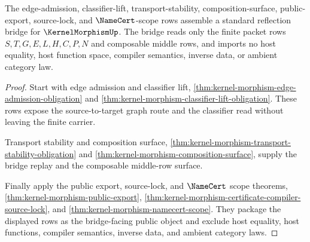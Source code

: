 \begin{theorem}
\label{thm:kernel-morphism-standard-reflection-bridge}
The edge-admission, classifier-lift, transport-stability, composition-surface, public-export, source-lock, and $\NameCert$-scope rows assemble a standard reflection bridge for $\KernelMorphismUp$. The bridge reads only the finite packet rows $S,T,G,E,L,H,C,P,N$ and composable middle rows, and imports no host equality, host function space, compiler semantics, inverse data, or ambient category law.
\end{theorem}
\begin{proof}
Start with edge admission and classifier lift, \autoref{thm:kernel-morphism-edge-admission-obligation} and \autoref{thm:kernel-morphism-classifier-lift-obligation}. These rows expose the source-to-target graph route and the classifier read without leaving the finite carrier.

Transport stability and composition surface, \autoref{thm:kernel-morphism-transport-stability-obligation} and \autoref{thm:kernel-morphism-composition-surface}, supply the bridge replay and the composable middle-row surface.

Finally apply the public export, source-lock, and $\NameCert$ scope theorems, \autoref{thm:kernel-morphism-public-export}, \autoref{thm:kernel-morphism-certificate-compiler-source-lock}, and \autoref{thm:kernel-morphism-namecert-scope}. They package the displayed rows as the bridge-facing public object and exclude host equality, host functions, compiler semantics, inverse data, and ambient category laws.
\end{proof}

